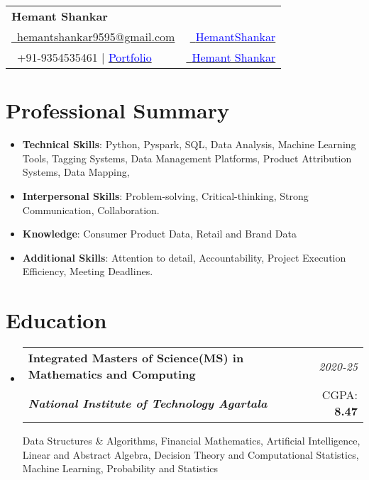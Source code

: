 \documentclass[a4paper,11pt]{article}
\makeatletter
\newcommand{\resumeSubheading}[4]{
\vspace{0.5mm}\item
    \begin{tabular*}{0.98\textwidth}[t]{l@{\extracolsep{\fill}}r}
        \textbf{#1} & \textit{\footnotesize{#4}} \\
        \textit{\footnotesize{#3}} &  \footnotesize{#2}\\
    \end{tabular*}
    \vspace{-2.4mm}
}
\newcommand{\resumeSubHeadingListStart}{\begin{itemize}[leftmargin=*,labelsep=0mm]}
\newcommand{\resumeSubHeadingListEnd}{\end{itemize}\vspace{2mm}}
\newcommand{\name}{Hemant Shankar} %
\newcommand{\phone}{9354535461 | \href{https://hemant-shankar-portfolio.onrender.com/}{\textcolor{blue}{Portfolio}}} %
\newcommand{\emaila}{hemantshankar9595@gmail.com} %
\makeatother
\begin{document}
\selectfont

{
\begin{tabularx}{\linewidth}{L r} \\
  \textbf{\Large \name}\\
  \href{mailto:hemantshankar9595@gmail.com}{\raisebox{0.0\height}{\footnotesize \faEnvelope}\ {\emaila}} & \href{https://github.com/HemantShankar}{\raisebox{0.0\height}{\footnotesize \faGithub}\ {\textcolor{blue}{HemantShankar}}} \\  
  {\raisebox{0.0\height}{\footnotesize \faPhone}\ +91-\phone} & \href{https://www.linkedin.com/in/hemant-shankar}{\raisebox{0.0\height}{\footnotesize \faLinkedin}\ {\textcolor{blue}{Hemant Shankar}}}
\end{tabularx}
}

\vspace{-4mm}
\section{\textbf{Professional Summary}}
\begin{itemize}
    \item \textbf{Technical Skills}\pythontools : Python, Pyspark, SQL, Data Analysis, Machine Learning Tools, Tagging Systems, Data Management Platforms, Product Attribution Systems, Data Mapping, 
    \item \textbf{Interpersonal Skills}\interskills : Problem-solving, Critical-thinking, Strong Communication, Collaboration.
    \item \textbf{Knowledge}\knowledge : Consumer Product Data, Retail and Brand Data
    \item \textbf{Additional Skills}\addskills : Attention to detail, Accountability, Project Execution Efficiency, Meeting Deadlines.
\end{itemize}
\section{\textbf{Education}}
  \resumeSubHeadingListStart
    \resumeSubheading
      { Integrated Masters of Science(MS) in Mathematics and Computing}{CGPA: \textbf{8.47}}
      {\textbf{National Institute of Technology Agartala}}{2020-25}
      \vspace{0.3cm}
      \small Data Structures \& Algorithms, Financial Mathematics, Artificial Intelligence, Linear and
Abstract Algebra, Decision Theory and
Computational Statistics, Machine Learning, 
Probability and Statistics
  \resumeSubHeadingListEnd
\vspace{-6.5mm}
%
\end{document}
